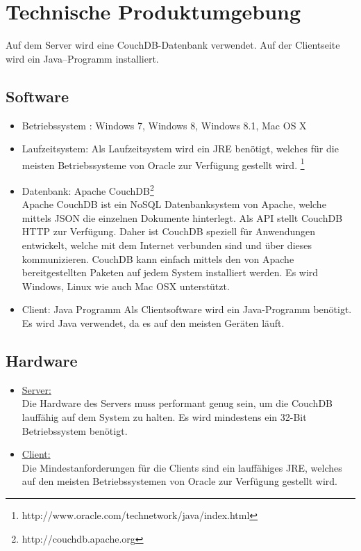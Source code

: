 \chapter{Technische Produktumgebung}
	Auf dem Server wird eine CouchDB-Datenbank verwendet. Auf der Clientseite wird ein Java–Programm installiert.
	
	\section{Software}
	\begin{itemize}
		\item Betriebssystem : Windows 7, Windows 8, Windows 8.1, Mac OS X
		\item Laufzeitsystem: Als Laufzeitsystem wird ein \ac{JRE} benötigt, welches für die meisten Betriebssysteme von Oracle zur Verfügung gestellt wird. \footnote{http://www.oracle.com/technetwork/java/index.html}
		\item Datenbank: Apache CouchDB\footnote{http://couchdb.apache.org}\\
			Apache CouchDB ist ein NoSQL Datenbanksystem von Apache, welche mittels \ac{JSON} die einzelnen Dokumente hinterlegt. Als API stellt CouchDB \ac{HTTP} zur Verfügung. Daher ist CouchDB speziell für Anwendungen entwickelt, welche mit dem Internet verbunden sind und über dieses kommunizieren. CouchDB kann einfach mittels den von Apache bereitgestellten Paketen auf jedem System installiert werden. Es wird Windows, Linux wie auch Mac OSX unterstützt. 
		\item Client: Java Programm
			Als Clientsoftware wird ein Java-Programm benötigt. Es wird Java verwendet, da es auf den meisten Geräten läuft.
	\end{itemize}

	\section{Hardware}
	\begin{itemize}
		\item \underline{Server:} \\
			Die Hardware des Servers muss performant genug sein, um die  	CouchDB lauffähig auf dem System zu halten. Es wird mindestens ein 32-Bit Betriebssystem benötigt.
		
		\item \underline{Client:}\\
			Die Mindestanforderungen für die Clients sind ein lauffähiges \ac{JRE}, welches auf den meisten Betriebssystemen von Oracle zur Verfügung gestellt wird.
	\end{itemize}

